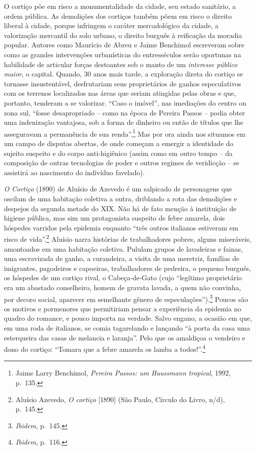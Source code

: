O cortiço põe em risco a monumentalidade da cidade, seu estado
sanitário, a ordem pública. As demolições dos cortiços também põem em
risco o direito liberal à cidade, porque infringem o caráter
mercadológico da cidade, a valorização mercantil do solo urbano, o
direito burguês à reificação da moradia popular. Autores como Maurício
de Abreu e Jaime Benchimol escreveram sobre como as grandes intervenções
urbanísticas do entresséculos serão oportunas na habilidade de articular
forças destoantes sob o manto de um \emph{interesse público maior}, o
capital. Quando, 30 anos mais tarde, a exploração direta do cortiço se
tornasse insustentável, desfrutariam seus proprietários de ganhos
especulativos com os terrenos localizados nas áreas que seriam atingidas
pelas obras e que, portanto, tenderam a se valorizar. ``Caso o imóvel'',
nas imediações do centro ou zona sul, ``fosse desapropriado -- como na
época de Pereira Passos -- podia obter uma indenização vantajosa, sob a
forma de dinheiro ou então de títulos que lhe asseguravam a permanência
de sua renda''.\footnote{Jaime Larry Benchimol, \emph{Pereira Passos: um
  Haussmann tropical}, 1992, p.~135.} Mas por ora ainda nos situamos em
um campo de disputas abertas, de onde começam a emergir a identidade do
sujeito suspeito e do corpo anti-higiênico (assim como em outro tempo --
da composição de outras tecnologias de poder e outros regimes de
veridicção -- se assistirá ao nascimento do indivíduo favelado).

\emph{O Cortiço} (1890) de Aluísio de Azevedo é um salpicado de
personagens que oscilam de uma habitação coletiva a outra, driblando a
rota das demolições e despejos da segunda metade do XIX. Não há de fato
menção à instituição de higiene pública, mas sim um protagonista
suspeito de febre amarela, dois hóspedes varridos pela epidemia enquanto
``três outros italianos estiveram em risco de vida''.\footnote{Aluísio
  Azevedo, \emph{O cortiço} {[}1890{]} (São Paulo, Círculo do Livro,
  n/d), p.~145.} Aluísio narra histórias de trabalhadores pobres, alguns
miseráveis, amontoados em uma habitação coletiva. Pululam grupos de
lavadeiras e fainas, uma escravizada de ganho, a curandeira, a visita de
uma meretriz, famílias de imigrantes, pagodeiros e capoeiras,
trabalhadores de pedreira, o pequeno burguês, os hóspedes de um cortiço
rival, o Cabeça-de-Gato (cujo ``legítimo proprietário era um abastado
conselheiro, homem de gravata lavada, a quem não convinha, por decoro
social, aparecer em semelhante gênero de especulações'').\footnote{\emph{Ibidem},
  p.~145.} Poucos são os motivos e pormenores que permitiriam pensar a
experiência da epidemia no quadro do romance, e pouco importa na
verdade. Salvo engano, a ocasião em que, em uma roda de italianos, se
comia tagarelando e lançando ``à porta da casa uma esterqueira das casas
de melancia e laranja''. Pelo que os amaldiçoa o vendeiro e dono do
cortiço: ``Tomara que a febre amarela os lamba a todos!''.\footnote{\emph{Ibidem},
  p.~116.}

